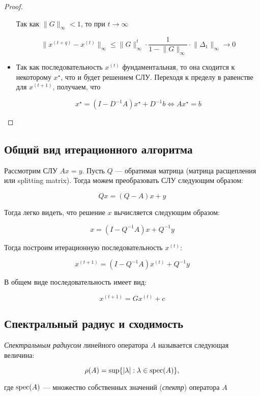 \begin{proof}
\begin{itemize}
        Так как $\lVert G \rVert_{\infty} < 1$, то при $t \longrightarrow \infty$

        \[
        \lVert x^{(t + q)} - x^{(t)} \rVert_{\infty} \leqslant \lVert G \rVert_{\infty}^{t} \cdot \frac{1}{1 - \lVert G \rVert_{\infty}} \cdot \lVert \Delta_1 \rVert_{\infty} \longrightarrow 0
        \]

        \item Так как последовательность $x^{(t)}$ фундаментальная, то она сходится к некоторому $x^{\star}$, что и будет решением СЛУ. Переходя к пределу в равенстве для $x^{(t+1)}$, получаем, что

        \[
        x^{\star} = (I - D^{-1} A) x^{\star} + D^{-1} b \iff Ax^{\star} = b
        \]
    \end{itemize}
\end{proof}

\subsection{Общий вид итерационного алгоритма}

Рассмотрим СЛУ $Ax = y$. Пусть $Q$ --- обратимая матрица (матрица расщепления или splitting matrix). Тогда можем преобразовать СЛУ следующим образом:

\[
Qx = (Q - A)x + y
\]

Тогда легко видеть, что решение $x$ вычисляется следующим образом:

\[
x = (I - Q^{-1} A) x + Q^{-1} y
\]

Тогда построим итерационную последовательность $x^{(t)}$:

\[
x^{(t+1)} = (I - Q^{-1} A) x^{(t)} + Q^{-1} y
\]

В общем виде последовательность имеет вид:

\[
x^{(t+1)} = G x^{(t)} + c
\]

\subsection{Спектральный радиус и сходимость}

\begin{definition}
    \textit{Спектральным радиусом} линейного оператора $A$ называется следующая величина:

    \[
    \rho(A) = \sup \{ |\lambda| : \lambda \in \operatorname{spec}(A) \},
    \]

     где $\operatorname{spec}(A)$ --- множество собственных значений (\textit{спектр}) оператора $A$
\end{definition}

